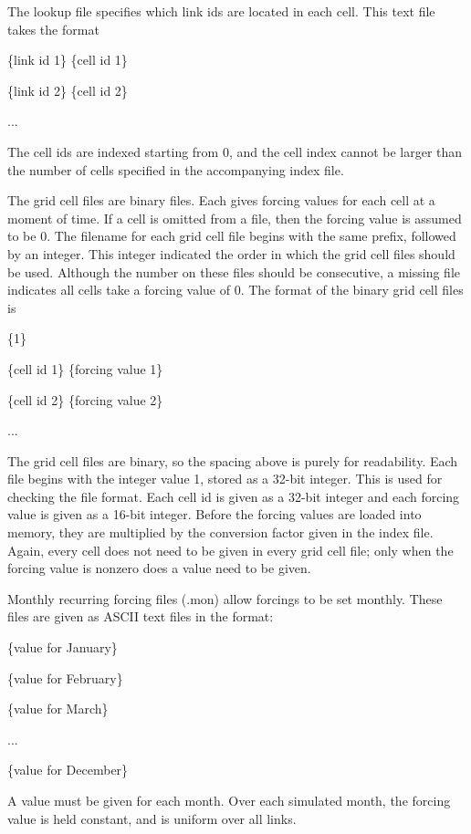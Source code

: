 \documentclass[12pt]{article}
\newenvironment{codeindent}
{\begin{list}{}
        {\setlength{\leftmargin}{.1in}}
        \item[]
}
{\end{list}}
\begin{document}
The lookup file specifies which link ids are located in each cell. This text file takes the format
\begin{codeindent}
 \{link id 1\} \{cell id 1\}
 
 \{link id 2\} \{cell id 2\}
 
 ...
\end{codeindent}
The cell ids are indexed starting from 0, and the cell index cannot be larger than the number of cells specified in the accompanying index file.

The grid cell files are binary files. Each gives forcing values for each cell at a moment of time. If a cell is omitted from a file, then the forcing value is assumed to be 0. The filename for each grid cell file begins with the same prefix, followed by an integer. This integer indicated the order in which the grid cell files should be used. Although the number on these files should be consecutive, a missing file indicates all cells take a forcing value of 0. The format of the binary grid cell files is
\begin{codeindent}
 \{1\}
 
 \{cell id 1\} \{forcing value 1\}
 
 \{cell id 2\} \{forcing value 2\}
 
 ...
\end{codeindent}
The grid cell files are binary, so the spacing above is purely for readability. Each file begins with the integer value 1, stored as a 32-bit integer. This is used for checking the file format. Each cell id is given as a 32-bit integer and each forcing value is given as a 16-bit integer. Before the forcing values are loaded into memory, they are multiplied by the conversion factor given in the index file. Again, every cell does not need to be given in every grid cell file; only when the forcing value is nonzero does a value need to be given.



Monthly recurring forcing files (.mon) allow forcings to be set monthly. These files are given as ASCII text files in the format:
\begin{codeindent}
 \{value for January\}
 
 \{value for February\}
 
 \{value for March\}
 
 ...
 
 \{value for December\}
\end{codeindent}
A value must be given for each month. Over each simulated month, the forcing value is held constant, and is uniform over all links.
\end{document}
